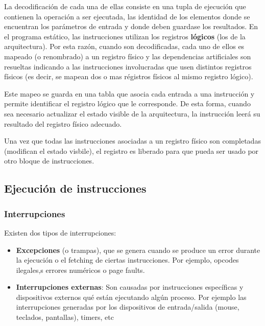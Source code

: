 La decodificación de cada una de ellas consiste en una tupla de ejecución que contienen la operación a ser ejecutada, las identidad de los elementos donde se encuentran los parámetros de entrada y donde deben guardase los resultados. En el programa estático, las instrucciones utilizan los registros \textbf{lógicos} (los de la arquitectura). Por esta razón, cuando son decodificadas, cada uno de ellos es mapeado (o renombrado) a un registro físico y las dependencias artificiales son resueltas indicando a las instrucciones involucradas que usen distintos registros físicos (es decir, se mapean dos o mas régistros físicos al mismo registro lógico).

Este mapeo se guarda en una tabla que asocia cada entrada a una instrucción y permite identificar el registro lógico que le corresponde. De esta forma, cuando sea necesario actualizar el estado visible de la arquitectura, la instrucción leerá su resultado del registro físico adecuado.

Una vez que todas las instrucciones asociadas a un registro físico son completadas (modifican el estado visbile), el registro es liberado para que pueda ser usado por otro bloque de instrucciones.

\subsection{Ejecución de instrucciones}
\subsubsection{Interrupciones}
Existen dos tipos de interrupciones:
\begin{itemize}
	\item \textbf{Excepciones} (o trampas), que se genera cuando se produce un error durante la ejecución o el fetching de ciertas instrucciones. Por ejemplo, opcodes ilegales,s errores numéricos o page faults.
	\item \textbf{Interrupciones externas}: Son causadas por instrucciones específicas y dispositivos externos qué están ejecutando algún proceso. Por ejemplo las interrupciones generadas por los dispositivos de entrada/salida (mouse, teclados, pantallas), timers, etc
\end{itemize}

